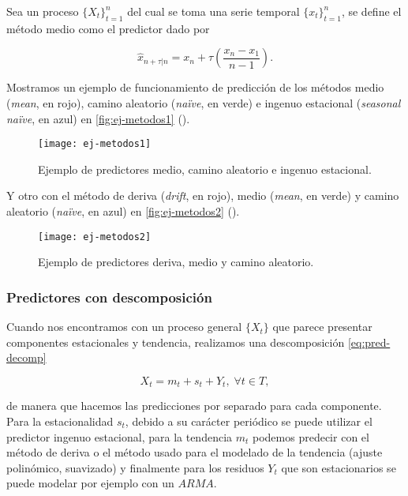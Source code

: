 \begin{definicion}
  Sea un proceso $\{X_t\}_{t = 1}^n$ del cual se toma una serie temporal $\{x_t\}_{t = 1}^n$, se define el método medio como el predictor dado por

  $$\hat{x}_{n + \tau | n} = x_n + \tau \left(\dfrac{x_n - x_1}{n - 1}\right).$$
  \label{def:metodo-deriva}
\end{definicion}

Mostramos un ejemplo de funcionamiento de predicción de los métodos medio (\emph{mean}, en rojo), camino aleatorio (\emph{naïve}, en verde) e ingenuo estacional (\emph{seasonal naïve}, en azul) en \autoref{fig:ej-metodos1} (\cite{hyndman2018forecasting}).

\begin{figure}[htpb]
  \centering
  \texttt{[image: ej-metodos1]}
  \caption{Ejemplo de predictores medio, camino aleatorio e ingenuo estacional.}
  \label{fig:ej-metodos1}
\end{figure}

Y otro con el método de deriva (\emph{drift}, en rojo), medio (\emph{mean}, en verde) y camino aleatorio (\emph{naïve}, en azul) en \autoref{fig:ej-metodos2} (\cite{hyndman2018forecasting}).

\begin{figure}[htpb]
  \centering
  \texttt{[image: ej-metodos2]}
  \caption{Ejemplo de predictores deriva, medio y  camino aleatorio.}
  \label{fig:ej-metodos2}
\end{figure}

\subsubsection{Predictores con descomposición}

Cuando nos encontramos con un proceso general $\{X_t\}$ que parece presentar componentes estacionales y tendencia, realizamos una descomposición \eqref{eq:pred-decomp}

\begin{equation}
  X_t = m_t + s_t + Y_t, \; \forall t \in T,
  \label{eq:pred-decomp}
\end{equation}

de manera que hacemos las predicciones por separado para cada componente. Para la estacionalidad $s_t$, debido a su carácter periódico se puede utilizar el predictor ingenuo estacional, para la tendencia $m_t$ podemos predecir con el método de deriva o el método usado para el modelado de la tendencia (ajuste polinómico, suavizado) y finalmente para los residuos $Y_t$ que son estacionarios se puede modelar por ejemplo con un $ARMA$.

